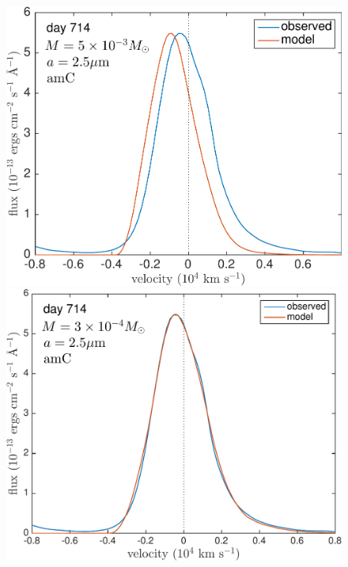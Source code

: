 \begin{figure}
\includegraphics[trim =0 20 0 0,clip=true,scale=0.35]{chapters/chapter5/images/silicates_take2/AmC_Dwek_Ha.pdf}
\hspace{3mm}
\includegraphics[trim =0 20 0 -10,clip=true,scale=0.35]{chapters/chapter5/images/silicates_take2/AmC_bestfit_Ha.pdf}


\end{figure}
